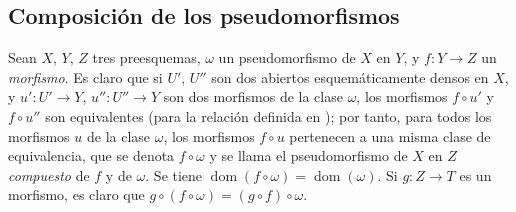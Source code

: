 \subsection{Composición de los pseudomorfismos}
\label{IV.20.3}

\begin{env}[20.3.1]
\label{IV.20.3.1}
Sean $X$, $Y$, $Z$ tres preesquemas, $\omega$ un pseudomorfismo de $X$ en $Y$, y $f:Y\to Z$ un \emph{morfismo}.
Es claro que si $U'$, $U''$ son dos abiertos esquemáticamente densos en $X$, y $u':U'\to Y$, $u'':U''\to Y$ son dos morfismos de la clase $\omega$, los morfismos $f\circ u'$ y $f\circ u''$ son equivalentes (para la relación definida en ); por tanto, para todos los morfismos $u$ de la clase $\omega$, los morfismos $f\circ u$ pertenecen a una misma clase de equivalencia, que se denota $f\circ\omega$ y se llama el pseudomorfismo de $X$ en $Z$ \emph{compuesto} de $f$ y de $\omega$.
Se tiene $\operatorname{dom}(f\circ\omega)=\operatorname{dom}(\omega)$.
Si $g:Z\to T$ es un morfismo, es claro que $g\circ(f\circ\omega)=(g\circ f)\circ\omega$.
\end{env}

